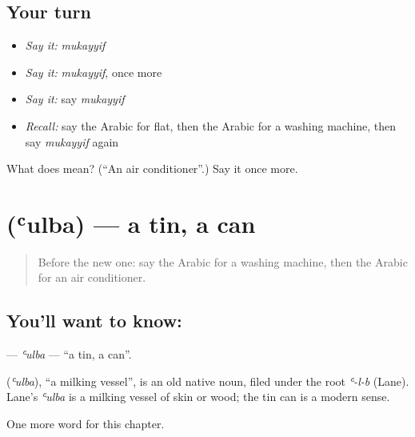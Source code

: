 \subsection*{Your turn}
\begin{itemize}
\raggedright
  \item \emph{Say it:} \emph{mukayyif}
  \item \emph{Say it:} \emph{mukayyif}, once more
  \item \emph{Say it:} say \emph{mukayyif}
  \item \emph{Recall:} say the Arabic for flat, then the Arabic for a washing machine, then say \emph{mukayyif} again
\end{itemize}

\begin{tcolorbox}[breakable,colback=teal!4,colframe=teal!35!black,title={Before you move on}]
What does  mean? (\textquotedblleft{}An air conditioner\textquotedblright{}.) Say it once more.
\end{tcolorbox}
\section[\texorpdfstring{\ar{علبة} (ʿulba)}{علبة (ʿulba)}]{ (ʿulba) — a tin, a can}

\label{lesson:AR-C181-ulba}



\begin{quote}
Before the new one: say the Arabic for a washing machine, then the Arabic for an air conditioner.
\end{quote}

\subsection*{You'll want to know: }
\textbf{} — \emph{ʿulba} — \textquotedblleft{}a tin, a can\textquotedblright{}.

\begin{cousinweb}
\textbf{} (\emph{ʿulba}), \textquotedblleft{}a milking vessel\textquotedblright{}, is an old native noun, filed under the root \emph{ʿ-l-b} (Lane). Lane's \emph{ʿulba} is a milking vessel of skin or wood; the tin can is a modern sense.
\end{cousinweb}

\begin{grammarlens}[title={What you've built}]
One more word for this chapter.
\end{grammarlens}

